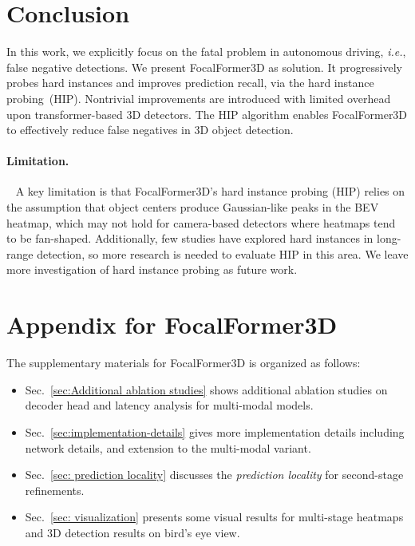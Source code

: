 \documentclass[10pt,twocolumn,letterpaper]{article}
\begin{document}
\section{Conclusion}
In this work, we explicitly focus on the fatal problem in autonomous driving, {\em i.e.}, false negative detections. We present FocalFormer3D as solution. It progressively probes hard instances and improves prediction recall, via the hard instance probing~(HIP). Nontrivial improvements are introduced with limited overhead upon transformer-based 3D detectors. The HIP algorithm enables FocalFormer3D to effectively reduce false negatives in 3D object detection.
\paragraph{Limitation.}~\label{limitation and future work}
A key limitation is that FocalFormer3D's hard instance probing (HIP) relies on the assumption that object centers produce Gaussian-like peaks in the BEV heatmap, which may not hold for camera-based detectors where heatmaps tend to be fan-shaped. Additionally, few studies have explored hard instances in long-range detection, so more research is needed to evaluate HIP in this area. We leave more investigation of hard instance probing as future work.



{\small


}

\newpage
\appendix


\section*{Appendix for FocalFormer3D}

The supplementary materials for FocalFormer3D is organized as follows:
\begin{itemize}
    
\item Sec.~\ref{sec:Additional ablation studies} shows additional ablation studies on decoder head and latency analysis for multi-modal models.
    \item Sec.~\ref{sec:implementation-details} gives more implementation details including network details, and extension to the multi-modal variant.
    \item Sec.~\ref{sec: prediction locality} discusses the \textit{prediction locality} for second-stage refinements.
\item Sec.~\ref{sec: visualization} presents some visual results for multi-stage heatmaps and 3D detection results on bird's eye view.
\end{itemize}
\end{document}
